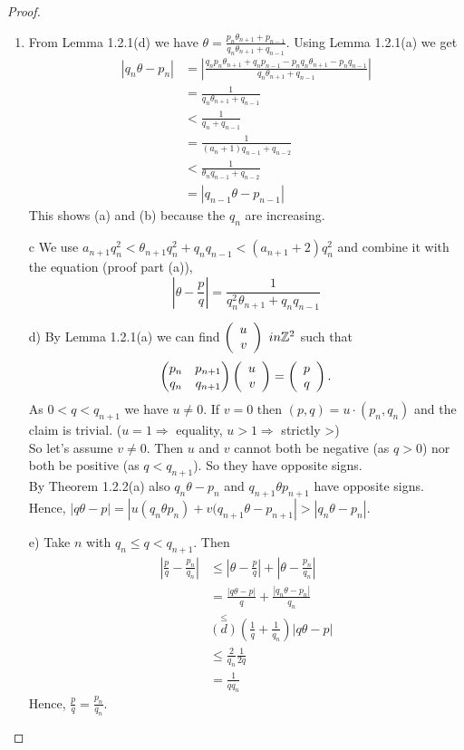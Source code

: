 \documentclass[NumTh.tex]{subfiles}
\begin{document}
\begin{proof}
  \begin{enumerate}
    \item From Lemma 1.2.1(d) we have $\theta = \frac{p_n \theta_{n+1} + p_{n-1}}{q_n \theta_{n+1} + q_{n-1}}$.
    Using Lemma 1.2.1(a) we get
    \begin{align}
    |q_n \theta - p_n| &= |\frac{q_n p_n \theta_{n+1} + q_n p_{n-1} - p_n q_n \theta_{n+1} - p_n q_{n-1}}{q_n \theta_{n+1} + q_{n-1}}| \\
    &= \frac{1}{q_n \theta_{n+1} + q_{n-1}}\\
    &< \frac{1}{q_n + q_{n-1}}\\
    &= \frac{1}{(a_n +1) q_{n-1} + q_{n-2}}\\
    &< \frac{1}{\theta_n q_{n-1} + q_{n-2}}\\
    &= | q_{n-1} \theta - p_{n-1}|
    \end{align}
    This shows (a) and (b) because the $q_n$ are increasing.
    \item[c] We use $a_{n+1} q_n^2 < \theta_{n+1} q_n^2 + q_n q_{n-1} < (a_{n+1} + 2) q_n^2$
    and combine it with the equation (proof part (a)),
    \[ |\theta - \frac{p}{q}| = \frac{1}{q_n^2 \theta_{n+1} + q_n q_{n-1}} \]
    
    
    \item[d)] By Lemma 1.2.1(a) we can find $\Vek{u}{v}{} \ in \Z^2$ such that
    \[ \left(\begin{matrix} p_n & p_{n+1}\\ q_n & q_{n+1} \end{matrix} \right) \Vek{u}{v}{} = \Vek{p}{q}{}. \]
    As $0 < q <q_{n+1}$ we have $u \neq 0$. If $v = 0$ then $(p,q) = u \cdot (p_n,q_n)$ and the claim is trivial. ($u = 1 \Rightarrow$ equality, $u > 1 \Rightarrow$ strictly >)\\
    So let's assume $v \neq 0$. Then $u$ and $v$ cannot both be negative (as $q > 0$) nor both be positive (as $q < q_{n+1}$).
    So they have opposite signs.\\
    By Theorem 1.2.2(a) also $q_n\theta - p_n$ and $q_{n+1} \theta p_{n+1}$ have opposite signs.
    Hence, $|q \theta - p| = |u (q_n \theta p_n) + v (q_{n+1} \theta - p_{n+1}| > |q_n \theta - p_n|$.
    \item[e)] Take $n$ with $q_n \leq q < q_{n+1}$. Then 
    \begin{align*} 
    |\frac{p}{q} - \frac{p_n}{q_n}| &\leq |\theta - \frac{p}{q}| + |\theta - \frac{p_n}{q_n}| \\
    &= \frac{|q \theta - p|}{q} + \frac{|q_n \theta - p_n|}{q_n}\\
    &\overset{\leq}{(d)} (\frac{1}{q} + \frac{1}{q_n}) |q \theta - p | \\
    &\leq \frac{2}{q_n} \frac{1}{2q} \\
    &= \frac{1}{q q_n}
    \end{align*}
    Hence, $\frac{p}{q} = \frac{p_n}{q_n}$.
  \end{enumerate}
\end{proof}
\end{document}
